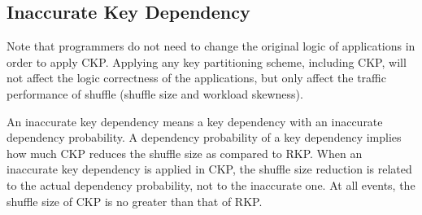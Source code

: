 \documentclass[10pt,journal,compsoc]{IEEEtran}
\begin{document}





\subsection{Inaccurate Key Dependency}\label{section:inaccurate}
Note that programmers do not need to change the original logic of
applications in order to apply CKP.
Applying any key partitioning scheme, including CKP, will not affect
the logic correctness of the applications, but only affect the traffic 
performance of shuffle (shuffle size and workload skewness). 

An inaccurate key dependency means a key dependency with 
an inaccurate dependency probability. 
A dependency probability of a key dependency implies 
how much CKP reduces the shuffle size as compared to RKP.
When an inaccurate key dependency is applied
in CKP, the shuffle size reduction
is related to the actual dependency probability, not to the inaccurate one. 
At all events, the shuffle size of CKP is no greater than that of RKP. 
\end{document}
